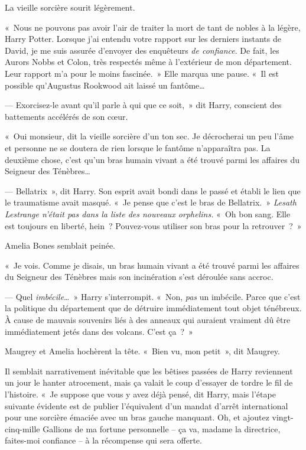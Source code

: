 La vieille sorcière sourit légèrement.

«~Nous ne pouvons pas avoir l'air de traiter la mort de tant de nobles à la légère, Harry Potter.
Lorsque j'ai entendu votre rapport sur les derniers instants de David, je me suis assurée d'envoyer des enquêteurs \emph{de confiance}.
De fait, les Aurors Nobbs et Colon, très respectés même à l'extérieur de mon département.
Leur rapport m'a pour le moins fascinée.~»
Elle marqua une pause.
«~Il est possible qu'Augustus Rookwood ait laissé un fantôme…

--- Exorcisez-le avant qu'il parle à qui que ce soit,~» dit Harry, conscient des battements accélérés de son cœur.

«~Oui monsieur, dit la vieille sorcière d'un ton sec.
Je décrocherai un peu l'âme et personne ne se doutera de rien lorsque le fantôme n'apparaîtra pas.
La deuxième chose, c'est qu'un bras humain vivant a été trouvé parmi les affaires du Seigneur des Ténèbres…

--- Bellatrix~», dit Harry.
Son esprit avait bondi dans le passé et établi le lien que le traumatisme avait masqué.
«~Je pense que c'est le bras de Bellatrix.~»
\emph{Lesath Lestrange n'était pas dans la liste des nouveaux orphelins.} «~Oh bon sang.
Elle est toujours en liberté, hein~?
Pouvez-vous utiliser son bras pour la retrouver~?~»

Amelia Bones semblait peinée.

«~Je vois.
Comme je disais, un bras humain vivant a été trouvé parmi les affaires du Seigneur des Ténèbres mais son incinération s'est déroulée sans accroc.

--- Quel \emph{imbécile}…~»
Harry s'interrompit.
«~Non, \emph{pas} un imbécile.
Parce que c'est la politique du département que de détruire immédiatement tout objet ténébreux.
À cause de mauvais souvenirs liés à des anneaux qui auraient vraiment dû être immédiatement jetés dans des volcans.
C'est ça~?~»

Maugrey et Amelia hochèrent la tête.
«~Bien vu, mon petit~», dit Maugrey.

Il semblait narrativement inévitable que les bêtises passées de Harry reviennent un jour le hanter atrocement, mais ça valait le coup d'essayer de tordre le fil de l'histoire.
«~Je suppose que vous y avez déjà pensé, dit Harry, mais l'étape suivante évidente est de publier l'équivalent d'un mandat d'arrêt international pour une sorcière émaciée avec un bras gauche manquant.
Oh, et ajoutez vingt-cinq-mille Gallions de ma fortune personnelle -- ça va, madame la directrice, faites-moi confiance -- à la récompense qui sera offerte.

